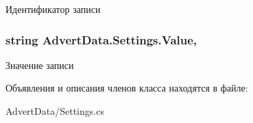 Идентификатор записи 

\hypertarget{class_advert_data_1_1_settings_aee6785e9f9bc8a7a75494e85ef379d91}{
\subsubsection[{Value}]{\setlength{\rightskip}{0pt plus 5cm}string Advert\+Data.\+Settings.\+Value\hspace{0.3cm}{\ttfamily [get]}, {\ttfamily [set]}}}\label{class_advert_data_1_1_settings_aee6785e9f9bc8a7a75494e85ef379d91}


Значение записи 



Объявления и описания членов класса находятся в файле\+:\begin{DoxyCompactItemize}
\item 
Advert\+Data/Settings.\+cs\end{DoxyCompactItemize}
